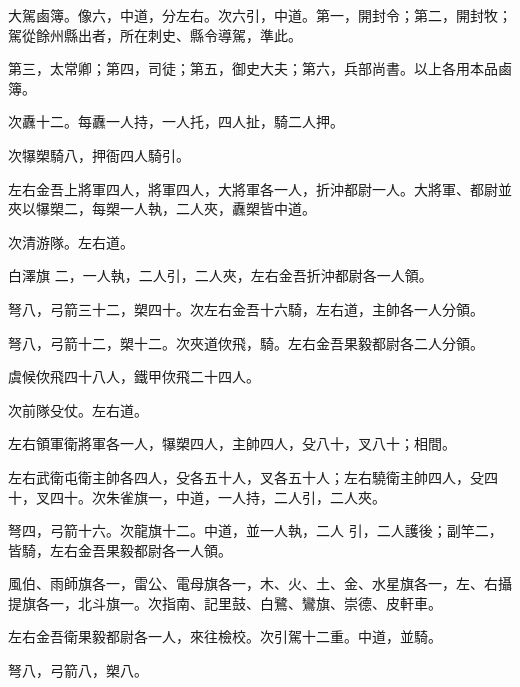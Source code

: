 \begin{pinyinscope}
 大駕鹵簿。像六，中道，分左右。次六引，中道。第一，開封令；第二，開封牧；駕從餘州縣出者，所在刺史、縣令導駕，準此。



 第三，太常卿；第四，司徒；第五，御史大夫；第六，兵部尚書。以上各用本品鹵簿。



 次纛十二。每纛一人持，一人托，四人扯，騎二人押。



 次犦槊騎八，押衙四人騎引。



 左右金吾上將軍四人，將軍四人，大將軍各一人，折沖都尉一人。大將軍、都尉並夾以犦槊二，每槊一人執，二人夾，纛槊皆中道。



 次清游隊。左右道。



 白澤旗
 二，一人執，二人引，二人夾，左右金吾折沖都尉各一人領。



 弩八，弓箭三十二，槊四十。次左右金吾十六騎，左右道，主帥各一人分領。



 弩八，弓箭十二，槊十二。次夾道佽飛，騎。左右金吾果毅都尉各二人分領。



 虞候佽飛四十八人，鐵甲佽飛二十四人。



 次前隊殳仗。左右道。



 左右領軍衛將軍各一人，犦槊四人，主帥四人，殳八十，叉八十；相間。



 左右武衛屯衛主帥各四人，殳各五十人，叉各五十人；左右驍衛主帥四人，殳四十，叉四十。次朱雀旗一，中道，一人持，二人引，二人夾。



 弩四，弓箭十六。次龍旗十二。中道，並一人執，二人
 引，二人護後；副竿二，皆騎，左右金吾果毅都尉各一人領。



 風伯、雨師旗各一，雷公、電母旗各一，木、火、土、金、水星旗各一，左、右攝提旗各一，北斗旗一。次指南、記里鼓、白鷺、鸞旗、崇德、皮軒車。



 左右金吾衛果毅都尉各一人，來往檢校。次引駕十二重。中道，並騎。



 弩八，弓箭八，槊八。




\end{pinyinscope}

